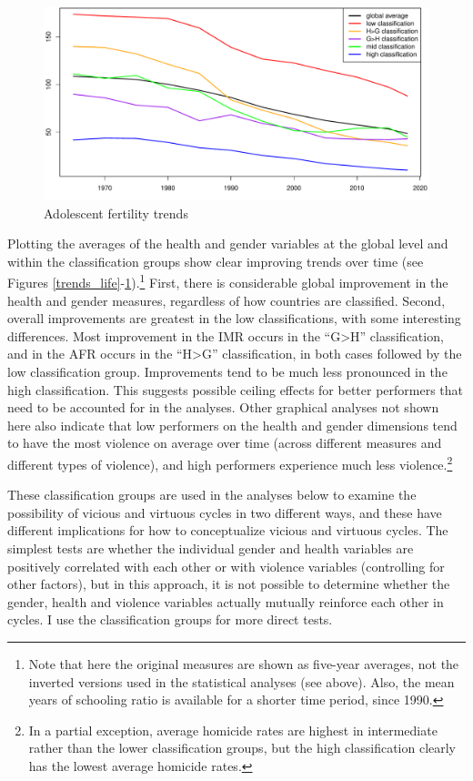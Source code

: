 \documentclass[12pt]{article}
\begin{document}
\begin{figure}[!htb]
    \centering
    \caption{Adolescent fertility trends}
    \label{trends_afr}
    \includegraphics[width=\textwidth]{trend_asfr_adol_wpp.pdf}
\end{figure}

Plotting the averages of the health and gender variables at the global level and within the classification groups show clear improving trends over time (see Figures \ref{trends_life}-\ref{trends_afr}).\footnote{Note that here the original measures are shown as five-year averages, not the inverted versions used in the statistical analyses (see above). Also, the mean years of schooling ratio is available for a shorter time period, since 1990.}
First, there is considerable global improvement in the health and gender measures, regardless of how countries are classified.
Second, overall improvements are greatest in the low classifications, with some interesting differences. Most improvement in the IMR occurs in the \enquote{G>H} classification, and in the AFR occurs in the \enquote{H>G} classification, in both cases followed by the low classification group.
Improvements tend to be much less pronounced in the high classification.
This suggests possible ceiling effects for better performers that need to be accounted for in the analyses.
Other graphical analyses not shown here also indicate that low performers on the health and gender dimensions tend to have the most violence on average over time (across different measures and different types of violence), and high performers experience much less violence.\footnote{In a partial exception, average homicide rates are highest in intermediate rather than the lower classification groups, but the high classification clearly has the lowest average homicide rates.}

These classification groups are used in the analyses below to examine the possibility of vicious and virtuous cycles in two different ways, and these have different implications for how to conceptualize vicious and virtuous cycles. The simplest tests are whether the individual gender and health variables are positively correlated with each other or with violence variables (controlling for other factors), but in this approach, it is not possible to determine whether the gender, health and violence variables actually mutually reinforce each other in cycles. I use the classification groups for more direct tests.
\end{document}
